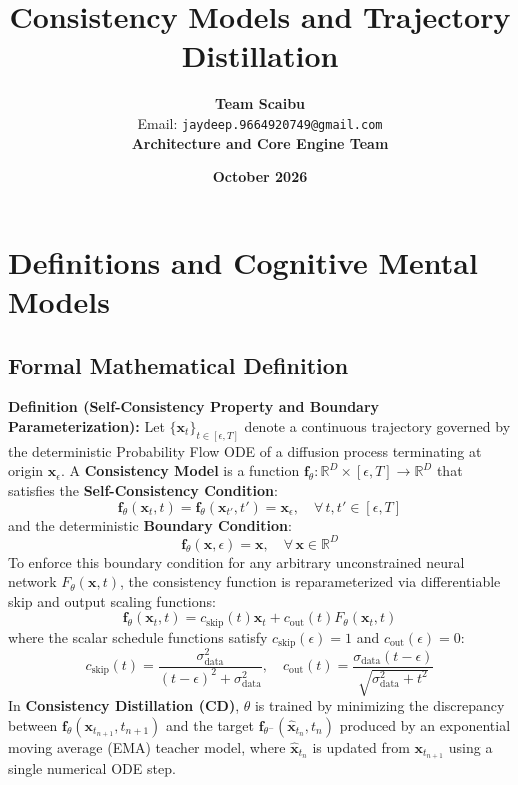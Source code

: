 \documentclass[11pt,a4paper]{article}
\title{\textbf{Consistency Models and Trajectory Distillation}}
\author{\textbf{Team Scaibu} \\ \small Email: \texttt{jaydeep.9664920749@gmail.com} \\ \small \textbf{Architecture and Core Engine Team}}
\date{\textbf{October 2026}}
\theoremstyle{definition}
\begin{document}
\maketitle

\section{Definitions and Cognitive Mental Models}

\subsection{Formal Mathematical Definition}
\textbf{Definition (Self-Consistency Property and Boundary Parameterization):}
Let $\{\mathbf{x}_t\}_{t \in [\epsilon, T]}$ denote a continuous trajectory governed by the deterministic Probability Flow ODE of a diffusion process terminating at origin $\mathbf{x}_\epsilon$. A \textbf{Consistency Model} is a function $\mathbf{f}_\theta: \mathbb{R}^D \times [\epsilon, T] \to \mathbb{R}^D$ that satisfies the \textbf{Self-Consistency Condition}:
{\boldmath
\begin{equation}
\mathbf{f}_\theta(\mathbf{x}_t, t) = \mathbf{f}_\theta(\mathbf{x}_{t'}, t') = \mathbf{x}_\epsilon, \quad \forall \, t, t' \in [\epsilon, T]
\end{equation}
}
and the deterministic \textbf{Boundary Condition}:
{\boldmath
\begin{equation}
\mathbf{f}_\theta(\mathbf{x}, \epsilon) = \mathbf{x}, \quad \forall \, \mathbf{x} \in \mathbb{R}^D
\end{equation}
}
To enforce this boundary condition for any arbitrary unconstrained neural network $F_\theta(\mathbf{x}, t)$, the consistency function is reparameterized via differentiable skip and output scaling functions:
{\boldmath
\begin{equation}
\mathbf{f}_\theta(\mathbf{x}_t, t) = c_{\text{skip}}(t)\mathbf{x}_t + c_{\text{out}}(t) F_\theta(\mathbf{x}_t, t)
\end{equation}
}
where the scalar schedule functions satisfy $c_{\text{skip}}(\epsilon) = 1$ and $c_{\text{out}}(\epsilon) = 0$:
{\boldmath
\begin{equation}
c_{\text{skip}}(t) = \frac{\sigma_{\text{data}}^2}{(t - \epsilon)^2 + \sigma_{\text{data}}^2}, \quad c_{\text{out}}(t) = \frac{\sigma_{\text{data}}(t - \epsilon)}{\sqrt{\sigma_{\text{data}}^2 + t^2}}
\end{equation}
}
In \textbf{Consistency Distillation (CD)}, $\theta$ is trained by minimizing the discrepancy between $\mathbf{f}_\theta(\mathbf{x}_{t_{n+1}}, t_{n+1})$ and the target $\mathbf{f}_{\theta^-}(\hat{\mathbf{x}}_{t_n}, t_n)$ produced by an exponential moving average (EMA) teacher model, where $\hat{\mathbf{x}}_{t_n}$ is updated from $\mathbf{x}_{t_{n+1}}$ using a single numerical ODE step.
\end{document}

